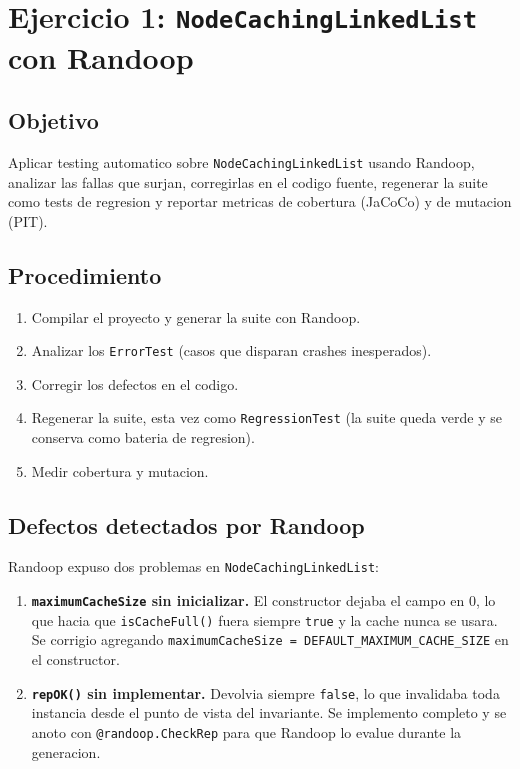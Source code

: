 \documentclass[12pt,a4paper]{article}
\begin{document}
\section{Ejercicio 1: \texttt{NodeCachingLinkedList} con Randoop}

\subsection{Objetivo}

Aplicar testing automatico sobre \texttt{NodeCachingLinkedList} usando Randoop, analizar las
fallas que surjan, corregirlas en el codigo fuente, regenerar la suite como tests de
regresion y reportar metricas de cobertura (JaCoCo) y de mutacion (PIT).

\subsection{Procedimiento}

\begin{enumerate}
  \item Compilar el proyecto y generar la suite con Randoop.
  \item Analizar los \texttt{ErrorTest} (casos que disparan crashes inesperados).
  \item Corregir los defectos en el codigo.
  \item Regenerar la suite, esta vez como \texttt{RegressionTest} (la suite queda
  verde y se conserva como bateria de regresion).
  \item Medir cobertura y mutacion.
\end{enumerate}

\subsection{Defectos detectados por Randoop}

Randoop expuso dos problemas en \texttt{NodeCachingLinkedList}:

\begin{enumerate}
  \item \textbf{\texttt{maximumCacheSize} sin inicializar.} El constructor dejaba el campo en
  $0$, lo que hacia que \texttt{isCacheFull()} fuera siempre \texttt{true} y la cache nunca
  se usara. Se corrigio agregando
  \texttt{maximumCacheSize = DEFAULT\_MAXIMUM\_CACHE\_SIZE} en el constructor.
  \item \textbf{\texttt{repOK()} sin implementar.} Devolvia siempre \texttt{false}, lo que
  invalidaba toda instancia desde el punto de vista del invariante. Se implemento
  completo y se anoto con \texttt{@randoop.CheckRep} para que Randoop lo evalue durante la
  generacion.
\end{enumerate}
\end{document}
